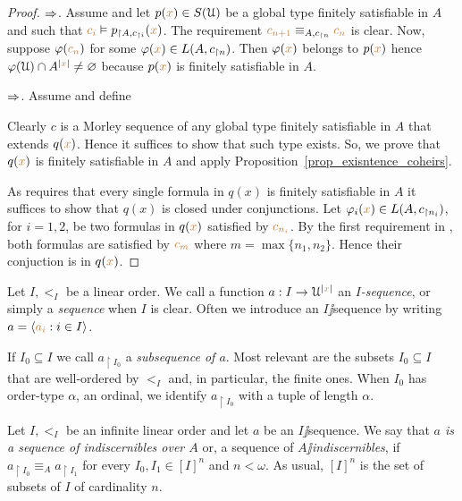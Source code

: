 \documentclass[creche.tex]{subfiles}
\begin{document}
\begin{proof}
$\Rightarrow$. Assume  and let $p({\color{brown} x})\in S(\EuScript U)$ be a global type finitely satisfiable in $A$ and such that ${\color{brown} c_i}\vDash p_{\restriction A,c_{\restriction i}}({\color{brown} x})$. The requirement ${\color{brown} c_{n+1}}\equiv_{A,c_{\restriction n}} {\color{brown} c_n}$ is clear. Now, suppose $\varphi({\color{brown} c_n})$ for some $\varphi({\color{brown} x})\in L(A,c_{\restriction n})$. Then $\varphi({\color{brown} x})$ belongs to $p({\color{brown} x})$ hence $\varphi(\EuScript U)\cap A^{|{\color{brown} x}|}\neq\varnothing$ because $p({\color{brown} x})$ is finitely satisfiable in $A$.

$\Rightarrow$. Assume  and define


Clearly $c$ is a Morley sequence of any global type finitely satisfiable in $A$ that extends $q({\color{brown} x})$. Hence it suffices to show that such type exists. So, we prove that $q({\color{brown} x})$ is finitely satisfiable in $A$ and apply Proposition~\ref{prop_exisntence_coheirs}. 

As  requires that every single formula in $q(x)$ is finitely satisfiable in $A$ it suffices to show that $q(x)$ is closed under conjunctions. Let $\varphi_i({\color{brown} x})\in L(A,c_{\restriction n_i})$, for $i=1,2$, be two formulas in $q({\color{brown} x})$ satisfied by  ${\color{brown} c_{n_i}}$. By the first requirement in , both formulas are satisfied by ${\color{brown} c_m}$ where $m=\max\{n_1,n_2\}$. Hence their conjuction is in  $q({\color{brown} x})$.
\end{proof}


Let $I,<_I$ be a linear order. We call a function $a:I\to\EuScript U^{|{\color{brown} x}|}$ an \emph{$I$-sequence}, or simply a \emph{sequence\/} when $I$ is clear. Often we introduce an $I\jj$sequence by writing $a=\langle{\color{brown}a_i}: i\in I\rangle$. 

If $I_0\subseteq I$ we call $a_{\restriction I_0}$ a \emph{subsequence of $a$}. Most relevant are the subsets $I_0\subseteq I$ that are well-ordered by $<_I$ and, in particular, the finite ones. When $I_0$ has order-type $\alpha$, an ordinal, we identify $a_{\restriction I_0}$ with a tuple of length $\alpha$.  

\begin{definition}
Let $I,<_I$ be an infinite linear order and let $a$ be an $I\jj$sequence. We say that \emph{$a$ is a sequence of indiscernibles over $A$\/} or, a sequence of \emph{$A\jj$indiscernibles}, if $a_{\restriction I_0}\equiv_A a_{\restriction I_1}$ for every $I_0,I_1\in[I]^n$ and $n<\omega$. As usual, \emph{$[I]^n$\/} is the set of subsets of $I$ of cardinality $n$.\QED
\end{definition}
\end{document}
